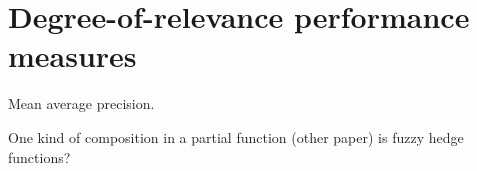 \documentclass[ ../main.tex]{subfiles}
\begin{document}
\section{Degree-of-relevance performance measures}

Mean average precision.



One kind of composition in a partial function (other paper) is fuzzy hedge functions?
\end{document}
